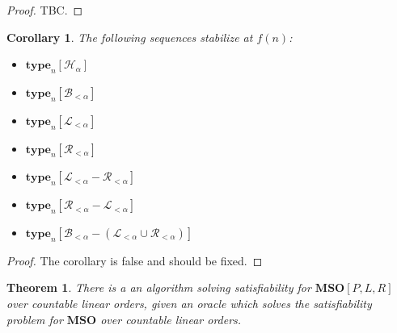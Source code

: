 \documentclass{article}
\newtheorem{theorem}{Theorem}
\newtheorem{corollary}{Corollary}
\newcommand{\brackets}[1]{\left[ {#1} \right]}
\newcommand{\mso}{\mathbf{MSO}}
\newcommand{\type}[2]{\mathbf{type}_{#1} \brackets{#2}}
\begin{document}
\begin{proof}
  TBC.
\end{proof}

\begin{corollary}
  The following sequences stabilize at $f(n)$:

  \begin{itemize}
    \item $\type{n}{\mathcal{H}_{\alpha}}$
    \item $\type{n}{\mathcal{B}_{< \alpha}}$
    \item $\type{n}{\mathcal{L}_{< \alpha}}$
    \item $\type{n}{\mathcal{R}_{< \alpha}}$
    \item $\type{n}{\mathcal{L}_{< \alpha} - \mathcal{R}_{< \alpha}}$
    \item $\type{n}{\mathcal{R}_{< \alpha} - \mathcal{L}_{< \alpha}}$
    \item $\type{n}{\mathcal{B}_{< \alpha} - (\mathcal{L}_{< \alpha} \cup \mathcal{R}_{< \alpha})}$
  \end{itemize}
\end{corollary}

\begin{proof}
  The corollary is false and should be fixed.
\end{proof}

\begin{theorem}
  There is a an algorithm solving satisfiability for $\mso[P, L, R]$ over countable linear orders,
  given an oracle which solves the satisfiability problem for $\mso$ over countable linear orders.
\end{theorem}
\end{document}

